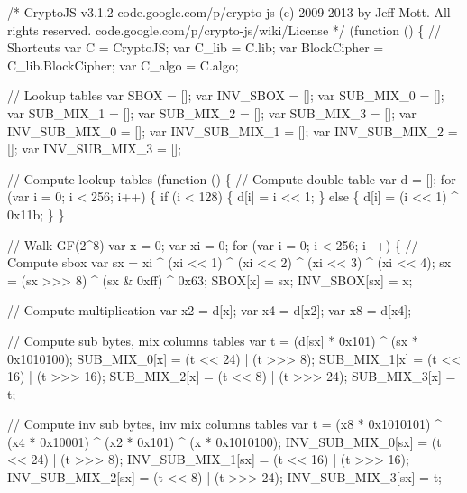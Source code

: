 \begin{DoxyCodeInclude}
\textcolor{comment}{/*}
\textcolor{comment}{CryptoJS v3.1.2}
\textcolor{comment}{code.google.com/p/crypto-js}
\textcolor{comment}{(c) 2009-2013 by Jeff Mott. All rights reserved.}
\textcolor{comment}{code.google.com/p/crypto-js/wiki/License}
\textcolor{comment}{*/}
(\textcolor{keyword}{function} () \{
    \textcolor{comment}{// Shortcuts}
    var C = CryptoJS;
    var C\_lib = C.lib;
    var BlockCipher = C\_lib.BlockCipher;
    var C\_algo = C.algo;

    \textcolor{comment}{// Lookup tables}
    var SBOX = [];
    var INV\_SBOX = [];
    var SUB\_MIX\_0 = [];
    var SUB\_MIX\_1 = [];
    var SUB\_MIX\_2 = [];
    var SUB\_MIX\_3 = [];
    var INV\_SUB\_MIX\_0 = [];
    var INV\_SUB\_MIX\_1 = [];
    var INV\_SUB\_MIX\_2 = [];
    var INV\_SUB\_MIX\_3 = [];

    \textcolor{comment}{// Compute lookup tables}
    (\textcolor{keyword}{function} () \{
        \textcolor{comment}{// Compute double table}
        var d = [];
        \textcolor{keywordflow}{for} (var i = 0; i < 256; i++) \{
            \textcolor{keywordflow}{if} (i < 128) \{
                d[i] = i << 1;
            \} \textcolor{keywordflow}{else} \{
                d[i] = (i << 1) ^ 0x11b;
            \}
        \}

        \textcolor{comment}{// Walk GF(2^8)}
        var x = 0;
        var xi = 0;
        \textcolor{keywordflow}{for} (var i = 0; i < 256; i++) \{
            \textcolor{comment}{// Compute sbox}
            var sx = xi ^ (xi << 1) ^ (xi << 2) ^ (xi << 3) ^ (xi << 4);
            sx = (sx >>> 8) ^ (sx & 0xff) ^ 0x63;
            SBOX[x] = sx;
            INV\_SBOX[sx] = x;

            \textcolor{comment}{// Compute multiplication}
            var x2 = d[x];
            var x4 = d[x2];
            var x8 = d[x4];

            \textcolor{comment}{// Compute sub bytes, mix columns tables}
            var t = (d[sx] * 0x101) ^ (sx * 0x1010100);
            SUB\_MIX\_0[x] = (t << 24) | (t >>> 8);
            SUB\_MIX\_1[x] = (t << 16) | (t >>> 16);
            SUB\_MIX\_2[x] = (t << 8)  | (t >>> 24);
            SUB\_MIX\_3[x] = t;

            \textcolor{comment}{// Compute inv sub bytes, inv mix columns tables}
            var t = (x8 * 0x1010101) ^ (x4 * 0x10001) ^ (x2 * 0x101) ^ (x * 0x1010100);
            INV\_SUB\_MIX\_0[sx] = (t << 24) | (t >>> 8);
            INV\_SUB\_MIX\_1[sx] = (t << 16) | (t >>> 16);
            INV\_SUB\_MIX\_2[sx] = (t << 8)  | (t >>> 24);
            INV\_SUB\_MIX\_3[sx] = t;


\end{DoxyCodeInclude}
